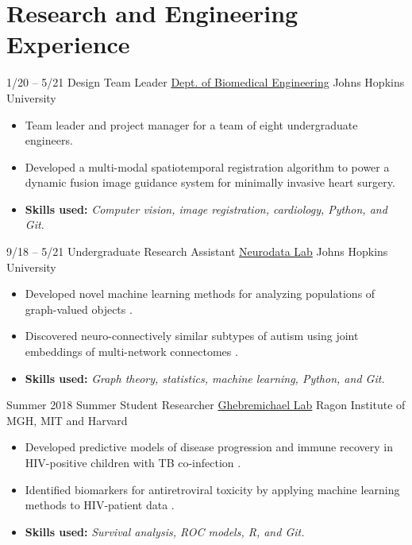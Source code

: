 \section{Research and Engineering Experience}
\cventry
{1/20 -- 5/21}
{Design Team Leader}
{\href{https://cbid.bme.jhu.edu/academics/undergraduate-studies/}{Dept. of Biomedical Engineering}}
{Johns Hopkins University}
{}
{
\begin{itemize}
    \item Team leader and project manager for a team of eight undergraduate engineers.
    \item Developed a multi-modal spatiotemporal registration algorithm to power a dynamic fusion image guidance system for minimally invasive heart surgery.
    \item \textbf{Skills used:} \textit{Computer vision, image registration, cardiology, Python, and Git.}
\end{itemize}{}
}

\cventry
{9/18 -- 5/21}
{Undergraduate Research Assistant}
{\href{https://neurodata.io}{Neurodata Lab}}
{Johns Hopkins University}
{}
{
\begin{itemize}
    \item Developed novel machine learning methods for analyzing populations of graph-valued objects \cite{gopalakrishnanDiscoveryMultiLevelNetwork2022, chungStatisticalConnectomics2020b}.
    \item Discovered neuro-connectively similar subtypes of autism using joint embeddings of multi-network connectomes \cite{wangVariabilityHeritabilityMouse2020, gopalakrishnanBMES2019}.
    \item \textbf{Skills used:} \textit{Graph theory, statistics, machine learning, Python, and Git.}
\end{itemize}
}

\cventry
{Summer 2018}
{Summer Student Researcher}
{\href{http://www.ragoninstitute.org/portfolio-item/ghebremichael/}{Ghebremichael Lab}}
{Ragon Institute of MGH, MIT and Harvard}
{}
{
\begin{itemize}
    \item Developed predictive models of disease progression and immune recovery in HIV-positive children with TB co-infection \cite{gopalakrishnanPreHAARTCD4Tlymphocytes2020}.
    \item Identified biomarkers for antiretroviral toxicity by applying machine learning methods to HIV-patient data \cite{leeComparisonMachineLearning2019a}.
    \item \textbf{Skills used:} \textit{Survival analysis, ROC models, R, and Git.}
\end{itemize}{}
}

